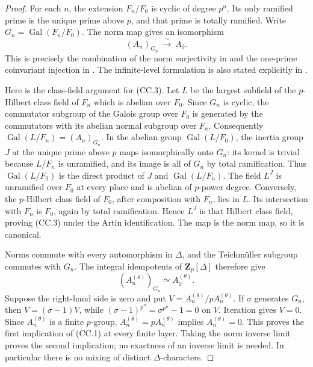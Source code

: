 \documentclass[11pt,a4paper]{article}
\theoremstyle{definition}
\begin{document}
\begin{proof}
For each $n$, the extension $F_n/F_0$ is cyclic of degree $p^n$.
Its only ramified prime is the unique prime above $p$, and that
prime is totally ramified. Write $G_n=\operatorname{Gal}(F_n/F_0)$.
The norm map gives an isomorphism
\[
                 (A_n)_{G_n}\ \xrightarrow{\ \sim\ }\ A_0.
 \tag{CC.3}
\]
This is precisely the combination of the norm surjectivity in
\cite[Corollary~1.3.9, p.~17]{SharifiIwasawaFull2026} and the
one-prime coinvariant injection in
\cite[Corollary~1.3.12, p.~18]{SharifiIwasawaFull2026}.
The infinite-level formulation is also stated explicitly in
\cite[Proposition~3.2.11, equation~(3.2.1), pp.~80--81;
Remark~3.2.12, p.~81]{SharifiIwasawaFull2026}.

Here is the class-field argument for (CC.3). Let $L$ be the largest
subfield of the $p$-Hilbert class field of $F_n$ which is abelian
over $F_0$. Since $G_n$ is cyclic, the commutator subgroup of the
Galois group over $F_0$ is generated by the commutators with its
abelian normal subgroup over $F_n$. Consequently
$\operatorname{Gal}(L/F_n)=(A_n)_{G_n}$.
In the abelian group $\operatorname{Gal}(L/F_0)$, the inertia
group $J$ at the unique prime above $p$ maps isomorphically onto
$G_n$: its kernel is trivial because $L/F_n$ is unramified, and
its image is all of $G_n$ by total ramification. Thus
$\operatorname{Gal}(L/F_0)$ is the direct product of $J$ and
$\operatorname{Gal}(L/F_n)$. The field $L^J$ is unramified over
$F_0$ at every place and is abelian of $p$-power degree. Conversely,
the $p$-Hilbert class field of $F_0$, after composition with $F_n$,
lies in $L$. Its intersection with $F_n$ is $F_0$, again by total
ramification. Hence $L^J$ is that Hilbert class field, proving
(CC.3) under the Artin identification. The map is the norm map,
so it is canonical.

Norms commute with every automorphism in $\Delta$, and the
Teichm\"uller subgroup commutes with $G_n$. The integral
idempotents of $\mathbf Z_p[\Delta]$ therefore give
\[
 (A_n^{(\theta)})_{G_n}\simeq A_0^{(\theta)}.
\]
Suppose the right-hand side is zero and put
$V=A_n^{(\theta)}/pA_n^{(\theta)}$. If $\sigma$ generates $G_n$,
then $V=(\sigma-1)V$, while
$(\sigma-1)^{p^n}=\sigma^{p^n}-1=0$ on $V$.
Iteration gives $V=0$. Since $A_n^{(\theta)}$ is a finite
$p$-group, $A_n^{(\theta)}=pA_n^{(\theta)}$ implies
$A_n^{(\theta)}=0$. This proves the first implication of (CC.1)
at every finite layer. Taking the norm inverse limit proves the
second implication; no exactness of an inverse limit is needed.
In particular there is no mixing of distinct $\Delta$-characters.


\end{proof}
\end{document}
